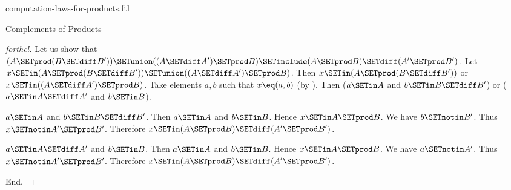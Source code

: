 \documentclass{stex}
\begin{document}
\begin{smodule}{computation-laws-for-products.ftl}
\begin{sfragment}{Complements of Products}
\begin{proof}[forthel]
    Let us show that $(A \SETprod (B \SETdiff B')) \SETunion ((A \SETdiff A') \SETprod B) \SETinclude (A \SETprod B) \SETdiff (A' \SETprod B')$.
      Let $x \SETin (A \SETprod (B \SETdiff B')) \SETunion ((A \SETdiff A') \SETprod B)$.
      Then $x \SETin (A \SETprod (B \SETdiff B'))$ or $x \SETin ((A \SETdiff A') \SETprod B)$.
      Take elements $a,b$ such that $x \eq (a, b)$ (by ).
      Then ($a \SETin A$ and $b \SETin B \SETdiff B'$) or ($a \SETin A \SETdiff A'$ and $b \SETin B$).

      \begin{case}{$a \SETin A$ and $b \SETin B \SETdiff B'$.}
        Then $a \SETin A$ and $b \SETin B$.
        Hence $x \SETin A \SETprod B$.
        We have $b \SETnotin B'$.
        Thus $x \SETnotin A' \SETprod B'$.
        Therefore $x \SETin (A \SETprod B) \SETdiff (A' \SETprod B')$.
      \end{case}

      \begin{case}{$a \SETin A \SETdiff A'$ and $b \SETin B$.}
        Then $a \SETin A$ and $b \SETin B$.
        Hence $x \SETin A \SETprod B$.
        We have $a \SETnotin A'$.
        Thus $x \SETnotin A' \SETprod B'$.
        Therefore $x \SETin (A \SETprod B) \SETdiff (A' \SETprod B')$.
      \end{case}
    End.
  \end{proof}
\end{sfragment}
\end{smodule}
\end{document}

